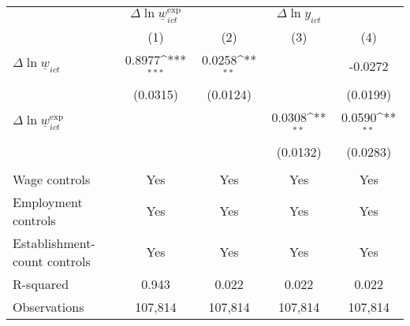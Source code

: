{
\def\sym#1{\ifmmode^{#1}\else\(^{#1}\)\fi}
\begin{tabular}{l*{4}{c}}
\hline\hline
          &\multicolumn{1}{c}{$\Delta \ln \underline{w}_{ict}^{\text{exp}}$}&\multicolumn{3}{c}{$\Delta \ln y_{ict}$}                \\\cmidrule(lr){2-2}\cmidrule(lr){3-5}
          &\multicolumn{1}{c}{(1)}         &\multicolumn{1}{c}{(2)}         &\multicolumn{1}{c}{(3)}         &\multicolumn{1}{c}{(4)}         \\
\hline
$\Delta \ln \underline{w}_{ict}$&   0.8977\sym{***}&   0.0258\sym{**} &                  &  -0.0272         \\
          & (0.0315)         & (0.0124)         &                  & (0.0199)         \\
[1em]
$\Delta \ln \underline{w}_{ict}^{\text{exp}}$&                  &                  &   0.0308\sym{**} &   0.0590\sym{**} \\
          &                  &                  & (0.0132)         & (0.0283)         \\
\hline
\vspace{-2mm}&                  &                  &                  &                  \\
Wage controls&      Yes         &      Yes         &      Yes         &      Yes         \\
Employment controls&      Yes         &      Yes         &      Yes         &      Yes         \\
Establishment-count controls&      Yes         &      Yes         &      Yes         &      Yes         \\
R-squared &    0.943         &    0.022         &    0.022         &    0.022         \\
Observations&  107,814         &  107,814         &  107,814         &  107,814         \\
\hline\hline
\end{tabular}
}
